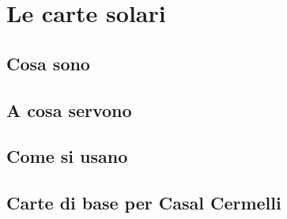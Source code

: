 \section{Le carte solari}
\label{sec:nota-import}

\subsection{Cosa sono}
\label{subsec:cosa-sono}


\subsection{A cosa servono}
\label{subsec:a-cosa-servono}


\subsection{Come si usano}
\label{subsec:come-si-usano}

\subsection{Carte di base per Casal Cermelli}
\label{subsec:carte-base}